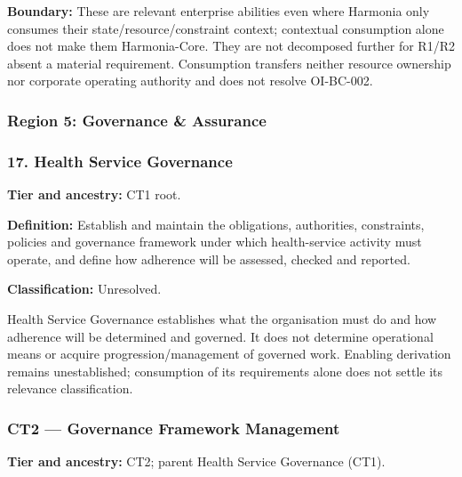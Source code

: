 \textbf{Boundary:} These are relevant enterprise abilities even where Harmonia only consumes their state/\allowbreak{}resource/\allowbreak{}constraint context; contextual consumption alone does not make them Harmonia-Core. They are not decomposed further for R1/\allowbreak{}R2 absent a material requirement. Consumption transfers neither resource ownership nor corporate operating authority and does not resolve OI-BC-002.

\label{rad:business:989}

\par\smallskip
{}\label{rad:business:991}
\subsubsection*{Region 5: Governance \& Assurance}
\label{rad:business:993}
\subsubsection*{17. Health Service Governance}
\label{rad:business:995}

\textbf{Tier and ancestry:} CT1 root.

\label{rad:business:997}

\textbf{Definition:} Establish and maintain the obligations, authorities, constraints, policies and governance framework under which health-service activity must operate, and define how adherence will be assessed, checked and reported.

\label{rad:business:999}

\textbf{Classification:} Unresolved.

\label{rad:business:1001}

Health Service Governance establishes what the organisation must do and how adherence will be determined and governed. It does not determine operational means or acquire progression/\allowbreak{}management of governed work. Enabling derivation remains unestablished; consumption of its requirements alone does not settle its relevance classification.

\label{rad:business:1003}
\subsubsection*{CT2 — Governance Framework Management}
\label{rad:business:1005}

\textbf{Tier and ancestry:} CT2; parent Health Service Governance (CT1).

